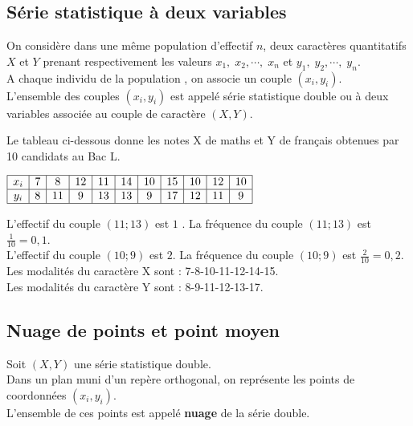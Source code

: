 \subsection{Série statistique à deux variables}
On considère dans une même  population d'effectif $ n $, deux caractères  quantitatifs $X$ et $Y$ prenant respectivement les valeurs  $x_1,\; x_2,\cdots,\;x_n$\; et \;  $  y_1,\; y_2, \cdots,\; y_n$. \\  A chaque individu de la population , on associe un  couple $(x_i,y_i)$.\\
L'ensemble des couples $(x_i,y_i)$ est appelé série statistique double ou à deux variables associée au couple de caractère $(X,Y)$.


\begin{example}

Le tableau ci-dessous donne les notes X de maths et Y de français obtenues par 10 candidats au Bac L.

\begin{center}

  $ \begin{array}{|c|c|c|c|c|c|c|c|c|c|c|}
\hline
  x_i & 7& 8 & 12&  11 &  14  &10 & 15 & 10  &12 & 10\\
 \hline
  y_i  & 8 & 11 & 9 & 13& 13 &9 &17 &12 &11&9 \\
 \hline
\end{array}$
\end{center}

L'effectif du couple $(11 ;13)$ est $1$ . La fréquence du couple $(11 ;13)$ est $\frac{1}{10} =0,1$.\\
L'effectif du couple $(10;9)$ est $2$. La fréquence du couple $(10 ;9)$ est $\frac{2}{10} =0,2$.\\
Les modalités du caractère X sont :
 7-8-10-11-12-14-15.\\
Les modalités du caractère Y sont :
8-9-11-12-13-17.

\end{example}


\subsection*{Nuage de points et point moyen}
Soit $(X,Y)$ une série  statistique double.\\  Dans un plan muni d'un repère
orthogonal, on représente les points de
coordonnées $(x_i ,y_i )$. \\
L'ensemble de ces points est appelé \textbf{nuage} de
la série double.

